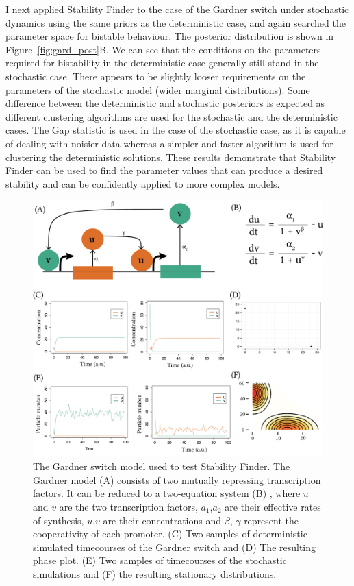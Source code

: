 I next applied Stability Finder to the case of the Gardner switch under stochastic dynamics using the same priors as the deterministic case, and again searched the parameter space for bistable behaviour. The posterior distribution is shown in Figure~\ref{fig:gard_post}B. We can see that the conditions on the parameters required for bistability in the deterministic case generally still stand in the stochastic case. There appears to be slightly looser requirements on the parameters of the stochastic model (wider marginal distributions). Some difference between the deterministic and stochastic posteriors is expected as different clustering algorithms are used for the stochastic and the deterministic cases. The Gap statistic is used in the case of the stochastic case, as it is capable of dealing with noisier data whereas a simpler and faster algorithm is used for clustering the deterministic solutions. These results demonstrate that Stability Finder can be used to find the parameter values that can produce a desired stability and can be confidently applied to more complex models.


\begin{figure}[htbp]
\begin{center}
	\includegraphics[scale=0.8]{../../chapters/chapterStabilityFinder/images/gardner_model.png}
	\caption[StabilityFinder used on the Gardner toggle switch]{\label{fig:gard_mod} The Gardner switch model used to test Stability Finder. The Gardner model (A) consists of two mutually repressing transcription factors. It can be reduced to a two-equation system (B) , where $u$ and $v$ are the two transcription factors, $a_1$,$a_2$ are their effective rates of synthesis, $u$,$v$ are their concentrations and $\beta$, $\gamma$ represent the cooperativity of each promoter. (C) Two samples of deterministic simulated timecourses of the Gardner switch and (D) The resulting phase plot. (E) Two samples of timecourses of the stochastic simulations and (F) the resulting stationary distributions.}
\end{center}
\end{figure}

